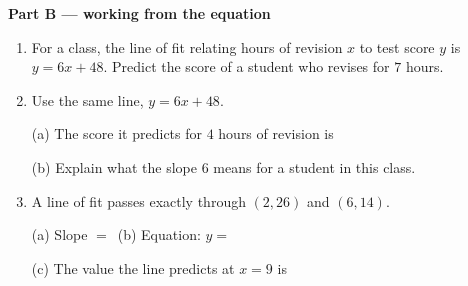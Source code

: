 \documentclass[12pt]{article}
\begin{document}
\vspace{0.25cm}
\noindent\textbf{Part B --- working from the equation}
\begin{enumerate}[resume, label=\textbf{\arabic*.}, leftmargin=1.15cm, itemsep=0pt, topsep=5pt]

\item \begin{minipage}[t]{\linewidth}\vspace{0pt}
For a class, the line of fit relating hours of revision $x$ to test score $y$ is $y = 6x + 48$. Predict the score of a student who revises for $7$ hours.
\par\vspace*{3.6cm}\ansline
\end{minipage}

\item \begin{minipage}[t]{\linewidth}\vspace{0pt}
Use the same line, $y = 6x + 48$.
\par\vspace{0.3cm}
(a) The score it predicts for $4$ hours of revision is~\ansblank
\par\vspace{1.6cm}
(b) Explain what the slope $6$ means for a student in this class.
\par\vspace{0.4cm}
\noindent\underline{\hspace{14.0cm}}
\par\vspace*{0.9cm}
\noindent\underline{\hspace{14.0cm}}
\par\vspace*{0.3cm}
\end{minipage}

\item \begin{minipage}[t]{\linewidth}\vspace{0pt}
A line of fit passes exactly through $(2, 26)$ and $(6, 14)$.
\par\vspace{0.3cm}
(a) Slope $= $~\ansblank \qquad (b) Equation: $y = $~\ansblank
\par\vspace{1.8cm}
(c) The value the line predicts at $x = 9$ is~\ansblank
\par\vspace*{2.8cm}
\end{minipage}


\end{enumerate}
\end{document}
